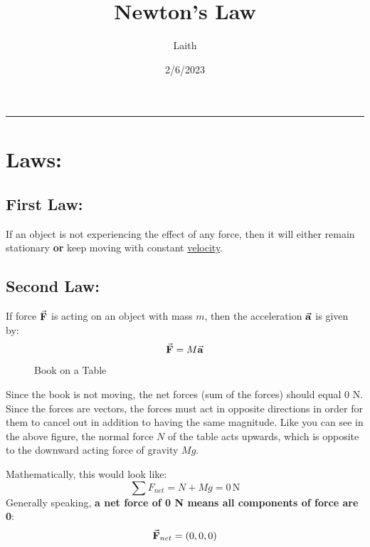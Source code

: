 \documentclass{article}
\title{Newton's Law}
\date{2/6/2023}
\author{Laith}
\begin{document}
\maketitle

\hrule
\section{Laws:}

\subsection*{First Law:}
    If an object is not experiencing the effect of any 
    force, then it will either remain stationary \textbf{or}
    keep moving with constant \underline{velocity}.

\subsection*{Second Law:}
    If force $\va{F}$ is acting on an object with 
    mass $m$, then the acceleration $\va{a}$ is given by:
    \[\va{F}=M\va{a}\]
\begin{multicols}{2}
\begin{figure}[H]
    \caption{Book on a Table}
\end{figure}

\columnbreak
Since the book is not moving, the net forces (sum of the forces) 
should equal 0 N. Since the forces are vectors, the forces must act 
in opposite directions in order for them to cancel out in addition to 
having the same magnitude. 
Like you can see in the above figure, the normal force $N$ of the table acts upwards, 
which is opposite to the downward acting force of gravity $Mg$. 

Mathematically, this would look like:
\[\sum F_{net} = N+Mg = 0\,\mathrm{N}\]
Generally speaking, \textbf{a net force of 0 N means all 
components of force are 0}:
\[ \va{F}_{net} = (0, 0, 0)\]
\end{multicols}
\end{document}
